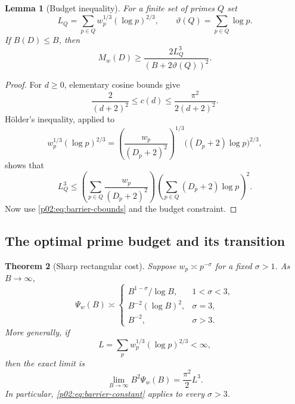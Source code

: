 \documentclass[11pt,letterpaper]{article}
\newtheorem{theorem}{Theorem}[section]
\newtheorem{lemma}[theorem]{Lemma}
\theoremstyle{definition}
\theoremstyle{remark}
\newcommand{\1}{\mathbf 1}
\begin{document}
\begin{lemma}[Budget inequality]\label{p02:lem:barrier-holder}
For a finite set of primes $Q$ set
\[
 L_Q=\sum_{p\in Q}w_p^{1/3}(\log p)^{2/3},\qquad
 \vartheta(Q)=\sum_{p\in Q}\log p.
\]
If $B(D)\le B$, then
\begin{equation}\label{p02:eq:barrier-holder}
 M_w(D)\ge\frac{2L_Q^3}{(B+2\vartheta(Q))^2}.
\end{equation}
\end{lemma}
\begin{proof}
For $d\ge0$, elementary cosine bounds give
\begin{equation}\label{p02:eq:barrier-cbounds}
 \frac2{(d+2)^2}\le c(d)\le\frac{\pi^2}{2(d+2)^2}.
\end{equation}
H\"older's inequality, applied to
\[
 w_p^{1/3}(\log p)^{2/3}
 =\left(\frac{w_p}{(D_p+2)^2}\right)^{1/3}
  \bigl((D_p+2)\log p\bigr)^{2/3},
\]
shows that
\[
 L_Q^3\le
 \left(\sum_{p\in Q}\frac{w_p}{(D_p+2)^2}\right)
 \left(\sum_{p\in Q}(D_p+2)\log p\right)^2.
\]
Now use \eqref{p02:eq:barrier-cbounds} and the budget constraint.
\end{proof}

\subsection{The optimal prime budget and its transition}

\begin{theorem}[Sharp rectangular cost]\label{p02:thm:barrier-cost}
Suppose $w_p\asymp p^{-\sigma}$ for a fixed $\sigma>1$. As $B\to\infty$,
\begin{equation}\label{p02:eq:barrier-orders}
 \Psi_w(B)\asymp
 \begin{cases}
 B^{1-\sigma}/\log B,&1<\sigma<3,\\
 B^{-2}(\log B)^2,&\sigma=3,\\
 B^{-2},&\sigma>3.
 \end{cases}
\end{equation}
More generally, if
\begin{equation}\label{p02:eq:barrier-L}
 L=\sum_pw_p^{1/3}(\log p)^{2/3}<\infty,
\end{equation}
then the exact limit is
\begin{equation}\label{p02:eq:barrier-constant}
 \lim_{B\to\infty}B^2\Psi_w(B)=\frac{\pi^2}{2}L^3.
\end{equation}
In particular, \eqref{p02:eq:barrier-constant} applies to every $\sigma>3$.
\end{theorem}
\end{document}

